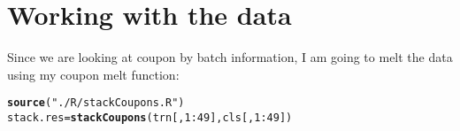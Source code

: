 \documentclass[10pt]{report}
\makeatletter
\newcommand{\hlnum}[1]{\textcolor[rgb]{0.686,0.059,0.569}{#1}}%
\newcommand{\hlstr}[1]{\textcolor[rgb]{0.192,0.494,0.8}{#1}}%
\newcommand{\hlopt}[1]{\textcolor[rgb]{0,0,0}{#1}}%
\newcommand{\hlstd}[1]{\textcolor[rgb]{0.345,0.345,0.345}{#1}}%
\newcommand{\hlkwb}[1]{\textcolor[rgb]{0.69,0.353,0.396}{#1}}%
\newcommand{\hlkwd}[1]{\textcolor[rgb]{0.737,0.353,0.396}{\textbf{#1}}}%
\newenvironment{kframe}{%
 \def\at@end@of@kframe{}%
 \ifinner\ifhmode%
  \def\at@end@of@kframe{\end{minipage}}%
  \begin{minipage}{\columnwidth}%
 \fi\fi%
 \def\FrameCommand##1{\hskip\@totalleftmargin \hskip-\fboxsep
 \colorbox{shadecolor}{##1}\hskip-\fboxsep
     \hskip-\linewidth \hskip-\@totalleftmargin \hskip\columnwidth}%
 \MakeFramed {\advance\hsize-\width
   \@totalleftmargin\z@ \linewidth\hsize
   \@setminipage}}%
 {\par\unskip\endMakeFramed%
 \at@end@of@kframe}
\newenvironment{knitrout}{}{} %
\makeatother
\begin{document}
\section{Working with the data}
Since we are looking at coupon by batch information, 
I am going to melt the data using my coupon melt function:
\begin{knitrout}
\color{fgcolor}\begin{kframe}
\begin{alltt}
   \hlkwd{source}\hlstd{(}\hlstr{"./R/stackCoupons.R"}\hlstd{)}
   \hlstd{stack.res} \hlkwb{=} \hlkwd{stackCoupons}\hlstd{(trn[,}\hlnum{1}\hlopt{:}\hlnum{49}\hlstd{],cls[,}\hlnum{1}\hlopt{:}\hlnum{49}\hlstd{])}
\end{alltt}



\end{kframe}
\end{knitrout}
\end{document}
